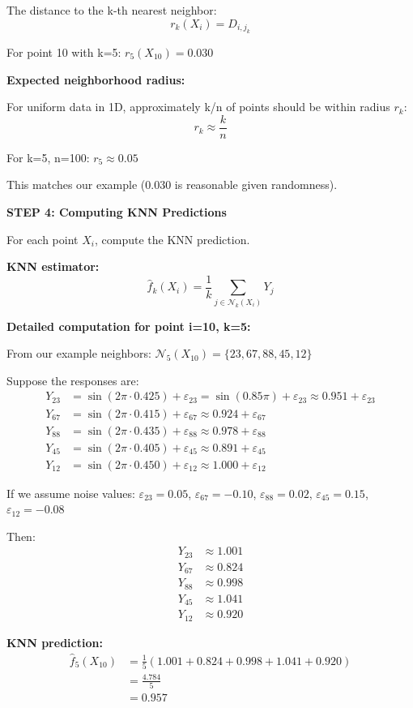 \documentclass[12pt]{article}
\begin{document}
\begin{solution}
The distance to the k-th nearest neighbor:
\[
r_k(X_i) = D_{i,j_k}
\]

For point 10 with k=5: $r_5(X_{10}) = 0.030$

\textbf{Expected neighborhood radius:}

For uniform data in 1D, approximately k/n of points should be within radius $r_k$:
\[
r_k \approx \frac{k}{n}
\]

For k=5, n=100: $r_5 \approx 0.05$

This matches our example (0.030 is reasonable given randomness).

\textbf{STEP 4: Computing KNN Predictions}

For each point $X_i$, compute the KNN prediction.

\textbf{KNN estimator:}
\[
\hat{f}_k(X_i) = \frac{1}{k}\sum_{j \in \mathcal{N}_k(X_i)} Y_j
\]

\textbf{Detailed computation for point i=10, k=5:}

From our example neighbors: $\mathcal{N}_5(X_{10}) = \{23, 67, 88, 45, 12\}$

Suppose the responses are:
\begin{align*}
Y_{23} &= \sin(2\pi \cdot 0.425) + \varepsilon_{23} = \sin(0.85\pi) + \varepsilon_{23} \approx 0.951 + \varepsilon_{23} \\
Y_{67} &= \sin(2\pi \cdot 0.415) + \varepsilon_{67} \approx 0.924 + \varepsilon_{67} \\
Y_{88} &= \sin(2\pi \cdot 0.435) + \varepsilon_{88} \approx 0.978 + \varepsilon_{88} \\
Y_{45} &= \sin(2\pi \cdot 0.405) + \varepsilon_{45} \approx 0.891 + \varepsilon_{45} \\
Y_{12} &= \sin(2\pi \cdot 0.450) + \varepsilon_{12} \approx 1.000 + \varepsilon_{12}
\end{align*}

If we assume noise values: $\varepsilon_{23} = 0.05$, $\varepsilon_{67} = -0.10$, $\varepsilon_{88} = 0.02$, $\varepsilon_{45} = 0.15$, $\varepsilon_{12} = -0.08$

Then:
\begin{align*}
Y_{23} &\approx 1.001 \\
Y_{67} &\approx 0.824 \\
Y_{88} &\approx 0.998 \\
Y_{45} &\approx 1.041 \\
Y_{12} &\approx 0.920
\end{align*}

\textbf{KNN prediction:}
\begin{align*}
\hat{f}_5(X_{10}) &= \frac{1}{5}(1.001 + 0.824 + 0.998 + 1.041 + 0.920) \\
&= \frac{4.784}{5} \\
&= 0.957
\end{align*}


\end{solution}
\end{document}
